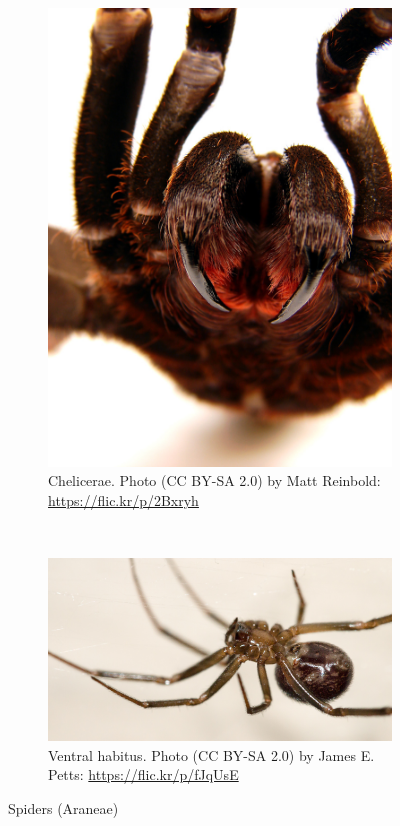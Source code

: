 \documentclass[letterpaper, 11pt]{article}
\begin{document}
\begin{figure}[ht!]
    \centering
    \begin{subfigure}[ht!]{0.25\textwidth}
        \includegraphics[width=\textwidth]{fang}
        \caption{Chelicerae. Photo (CC BY-SA 2.0) by Matt Reinbold: \url{https://flic.kr/p/2Bxryh}}
        \label{fig:fang}
    \end{subfigure}
    ~ %
    \begin{subfigure}[ht!]{0.65\textwidth}
        \includegraphics[width=\textwidth]{spider}
        \caption{Ventral habitus. Photo (CC BY-SA 2.0) by James E. Petts: \url{https://flic.kr/p/fJqUsE}}
        \label{fig:spider}
    \end{subfigure}
    \caption{Spiders (Araneae)}\label{fig:spiders}
\end{figure}
\end{document}

